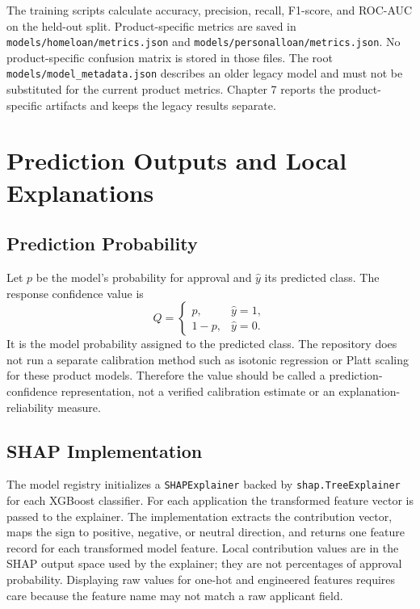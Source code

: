 The training scripts calculate accuracy, precision, recall, F1-score, and ROC-AUC on the held-out split. Product-specific metrics are saved in \texttt{models/homeloan/metrics.json} and \texttt{models/personalloan/metrics.json}. No product-specific confusion matrix is stored in those files. The root \texttt{models/model\_metadata.json} describes an older legacy model and must not be substituted for the current product metrics. Chapter 7 reports the product-specific artifacts and keeps the legacy results separate.

\section{Prediction Outputs and Local Explanations}
\subsection{Prediction Probability}
Let $p$ be the model's probability for approval and $\hat y$ its predicted class. The response confidence value is
\begin{equation}
  Q=\begin{cases}p,&\hat y=1,\\1-p,&\hat y=0.\end{cases}
\end{equation}
It is the model probability assigned to the predicted class. The repository does not run a separate calibration method such as isotonic regression or Platt scaling for these product models. Therefore the value should be called a prediction-confidence representation, not a verified calibration estimate or an explanation-reliability measure.

\subsection{SHAP Implementation}
The model registry initializes a \texttt{SHAPExplainer} backed by \texttt{shap.TreeExplainer} for each XGBoost classifier. For each application the transformed feature vector is passed to the explainer. The implementation extracts the contribution vector, maps the sign to positive, negative, or neutral direction, and returns one feature record for each transformed model feature. Local contribution values are in the SHAP output space used by the explainer; they are not percentages of approval probability. Displaying raw values for one-hot and engineered features requires care because the feature name may not match a raw applicant field.

